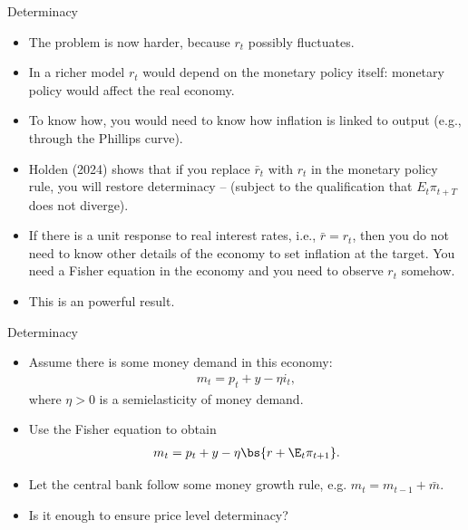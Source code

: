 \documentclass[11pt,xcolor={dvipsnames},aspectratio=159,hyperref={pdftex,pdfpagemode=UseNone,hidelinks,pdfdisplaydoctitle=true},usepdftitle=false]{beamer}
\begin{document}
        \begin{frame}{Determinacy}
            \begin{itemize}
                    \item The problem is now harder, because $r_t$ possibly fluctuates.
                    \item In a richer model $r_t$ would depend on the monetary policy itself: monetary policy would affect the real economy. 
                    \item To know how, you would need to know how inflation is linked to output (e.g., through the Phillips curve).
                    \item Holden (2024) shows that if you replace $\bar{r}_t$ with $r_t$ in the monetary policy rule, you will restore determinacy --  (subject to the qualification that $E_t \pi_{t+T}$ does not diverge).
                    \item If there is a unit response to real interest rates, i.e., $\bar{r} = r_t$, then you do not need to know other details of the economy to set inflation at the target. You  need a Fisher equation in the economy and you need to observe $r_t$ somehow. 
                    \item This is an  powerful result. 
                \end{itemize}
            \end{frame}


        \begin{frame}{Determinacy}
            \begin{itemize}
                    \item Assume there is some money demand in this economy: \begin{align*}
                    m_t = p_t +  y - \eta i_t,\end{align*} where $\eta>0$ is a semielasticity of money demand.
                    \item Use the Fisher equation to obtain 
                    \begin{align*}
                        m_t = p_t +  y - \eta \bs{r + \E_t \pi_{t+1}}.
                    \end{align*}
                    \item Let the central bank follow some money growth rule, e.g. $m_t =  m_{t-1} + \bar{m} $.
                    \item Is it enough to ensure price level determinacy?
                \end{itemize}
            \end{frame}
\end{document}
